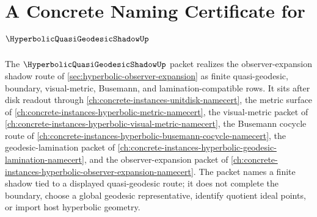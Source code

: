 \chapter{A Concrete Naming Certificate for $\HyperbolicQuasiGeodesicShadowUp$}
\label{ch:concrete-instances-hyperbolic-quasi-geodesic-shadow-namecert}

The $\HyperbolicQuasiGeodesicShadowUp$ packet realizes the observer-expansion shadow route of \autoref{sec:hyperbolic-observer-expansion} as finite quasi-geodesic, boundary, visual-metric, Busemann, and lamination-compatible rows. It sits after disk readout through \autoref{ch:concrete-instances-unitdisk-namecert}, the metric surface of \autoref{ch:concrete-instances-hyperbolic-metric-namecert}, the visual-metric packet of \autoref{ch:concrete-instances-hyperbolic-visual-metric-namecert}, the Busemann cocycle route of \autoref{ch:concrete-instances-hyperbolic-busemann-cocycle-namecert}, the geodesic-lamination packet of \autoref{ch:concrete-instances-hyperbolic-geodesic-lamination-namecert}, and the observer-expansion packet of \autoref{ch:concrete-instances-hyperbolic-observer-expansion-namecert}. The packet names a finite shadow tied to a displayed quasi-geodesic route; it does not complete the boundary, choose a global geodesic representative, identify quotient ideal points, or import host hyperbolic geometry.

